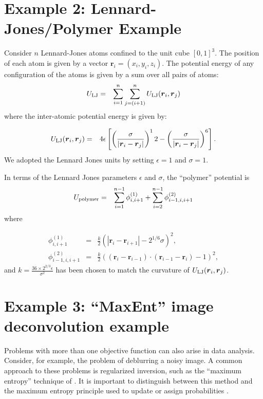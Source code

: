 \documentclass[journal,article,accept,moreauthors,pdftex,12pt,a4paper]{mdpi}
\begin{document}
\section{Example 2: Lennard-Jones/Polymer Example}

Consider $n$ Lennard-Jones atoms confined to the unit cube $[0, 1]^3$.
The position of each atom is given by a vector
$\boldsymbol{r}_i = (x_i, y_i, z_i)$.
The potential energy of any configuration of the atoms is given by
a sum over all pairs of atoms:
\begin{eqnarray}
U_{\rm LJ} &=& \sum_{i=1}^n\sum_{j=(i+1)}^n U_{\rm LJ}
(\boldsymbol{r}_i, \boldsymbol{r}_j)
\end{eqnarray}
where the inter-atomic potential energy is given by:

\begin{eqnarray}
U_{\rm LJ}(\boldsymbol{r}_i, \boldsymbol{r}_j)
&=& 4\epsilon
\left[
\left(\frac{\sigma}{|\boldsymbol{r}_i - \boldsymbol{r}_j|}\right)^12 -
\left(\frac{\sigma}{|\boldsymbol{r}_i - \boldsymbol{r}_j|}\right)^6
\right].
\end{eqnarray}
We adopted the Lennard Jones units by setting $\epsilon=1$ and $\sigma=1$.

In terms of the Lennard Jones parameters $\epsilon$ and $\sigma$, the
``polymer'' potential is
\begin{eqnarray}
U_{\rm polymer} &=&
\sum_{i=1}^{n-1} \phi^{(1)}_{i,i+1} + \sum_{i=2}^{n-1} \phi^{(2)}_{i-1, i, i+1}
\end{eqnarray}
where

\begin{eqnarray}
\phi^{(1)}_{i,i+1} &=& \frac{k}{2}\left(|\boldsymbol{r}_i - \boldsymbol{r}_{i+1}|- 2^{1/6}\sigma\right)^2,\\
\phi^{(2)}_{i-1, i, i+1} &=& \frac{k}{2}
\left((\boldsymbol{r}_i - \boldsymbol{r}_{i-1})\cdot(\boldsymbol{r}_{i-1} - \boldsymbol{r}_{i}) - 1\right)^2,
\end{eqnarray}
and $k=\frac{36 \times 2^{2/3}\epsilon}{\sigma^2}$ has been chosen to match
the curvature of $U_{\rm LJ}(\boldsymbol{r}_i, \boldsymbol{r}_j)$.


\section{Example 3: ``MaxEnt'' image deconvolution example}
Problems with more than one objective function can also arise in data
analysis. Consider, for example, the problem of deblurring a noisy
image. A common approach to these problems is regularized inversion,
such as the ``maximum entropy'' technique of \citet{gull}. It is important
to distinguish between this method and the maximum entropy principle used
to update or assign probabilities \citep{caticha}.
\end{document}
